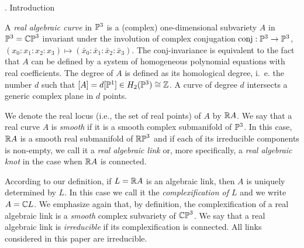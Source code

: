 \def\eqLK       {7}
\def\eqNMw      {8}
\def\eqSkein    {9}
\def\eqTtwo     {10}
\def\eqAL       {11}
\def\eqSkeinC   {12}
\def\eqTtwoPQ   {13}
\def\eqNMbraid  {14}
\def\eqCaseB    {15}

\def\figHopf    {1}
\def\figHypPos  {2}
\def\figCusp    {3}
\def\figChu     {4}
\def\figChuInv  {5}
\def\figTwoChu  {6}
\def\figSchPrf  {7}
\def\figR       {8}
\def\figCycloid {9}
\def\figT       {10}
\def\figSmoo    {11}
\def\figSmooG   {12}
\def\figA       {13}
\def\figB       {14}

\def\CondW  {(i)}
\def\CondWA {(i$'$)}
\def\CondH  {(ii)}
\def\CondPS {(iii${}^{\text{t}}$)}
\def\CondPSA{(iii${}^{\text{a}}$)}
\def\CondCr {(iv${}^{\text{t}}$)}   \let \CondCR \CondCr
\def\CondCrA{(iv${}^{\text{a}}$)}   \let \CondCRA \CondCrA
\def\CondT  {(v)}
\def\CondTA {(v$'$)}



\document

. Introduction
\endhead

 \endsubhead
A {\it real algebraic curve} in $\P^3$ is a (complex) one-dimensional subvariety $A$ in
$\P^3=\CP^3$ invariant under the involution of complex conjugation
$\conj:\P^3\to\P^3$, $(x_0:x_1:x_2:x_3)\mapsto(\bar x_0:\bar x_1:\bar x_2:\bar x_3)$.
The conj-invariance is equivalent to the fact that $A$ can be defined by a system of
homogeneous polynomial equations with real coefficients.
The degree of $A$ is defined as its homological degree, i.~e. the number $d$ such that
$[A] = d[\P^1]\in H_2(\P^3)\cong\Z$. A curve of degree $d$ intersects a generic complex plane
in $d$ points.

We denote the real locus (i.e., the set of real points) of $A$ by $\R A$.
We say that a real curve $A$ is {\it smooth} if it is a smooth complex submanifold of $\P^3$.
In this case, $\R A$ is a smooth real submanifold of $\RP^3$ and if each of its irreducible components
is non-empty,
we call it a {\it real algebraic link} or, more specifically,
a {\it real algebraic knot} in the case when $\R A$ is connected.

According to our definition, if $L=\R A$ is an algebraic link, then $A$ is uniquely
determined by $L$. In this case we call it the {\it complexification of $L$} and we write
$A=\C L$. We emphasize again that, by definition, the complexification of a real algebraic link
is a {\sl smooth} complex subvariety of $\CP^3$.
We say that a real algebraic link is {\it irreducible} if its complexification is connected.
All links considered in this paper are irreducible.

